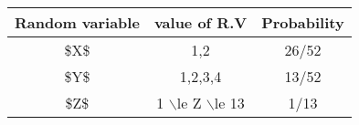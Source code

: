 \begin{tabular}{|c|c|c|}
\hline
Random	variable	&	value	of R.V	&	Probability	\\
\hline
\$X\$	        	&1,2     	&26/52	\\
\hline
\$Y\$	        	&1,2,3,4	&13/52	\\
\hline
\$Z\$		&1 $\backslash$le Z $\backslash$le 13		&1/13	\\
\hline
\end{tabular}
